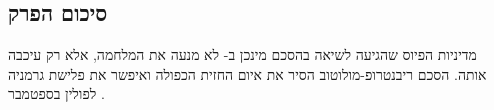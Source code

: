 \bigskip
\begin{otherlanguage}{hebrew}
\subsection*{סיכום הפרק}

מדיניות הפיוס שהגיעה לשיאה בהסכם מינכן ב-{\endL} לא מנעה את המלחמה, אלא רק עיכבה אותה. הסכם ריבנטרופ-מולוטוב הסיר את איום החזית הכפולה ואיפשר את פלישת גרמניה לפולין בספטמבר {\endL}.

\end{otherlanguage}

\clearpage
